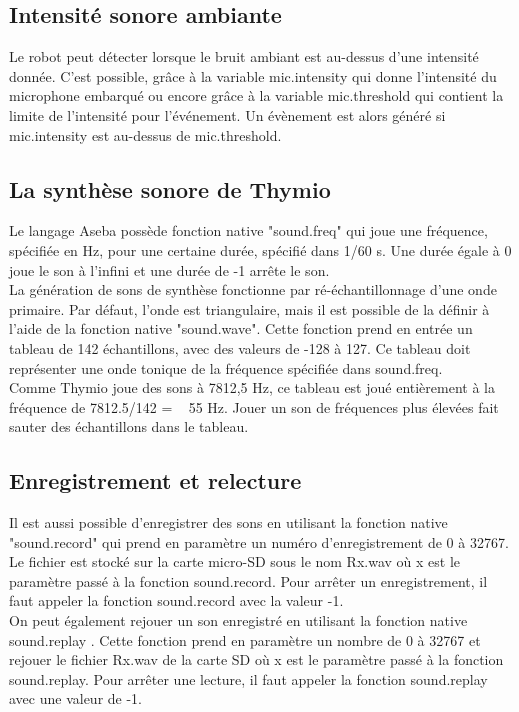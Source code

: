 \documentclass[a4paper, 12pt]{report}
\begin{document}
\subsection{Intensité sonore ambiante}
Le robot peut détecter lorsque le bruit ambiant est au-dessus d'une intensité donnée. C'est possible, grâce à la variable mic.intensity qui donne l'intensité du microphone embarqué ou encore grâce à la variable mic.threshold qui contient la limite de l'intensité pour l'événement. Un évènement est alors généré si mic.intensity est au-dessus de mic.threshold.\\

\subsection{La synthèse sonore de Thymio}
Le langage Aseba possède fonction native "sound.freq" qui joue une fréquence, spécifiée en Hz, pour une certaine durée, spécifié dans 1/60 s. Une durée égale à 0 joue le son à l'infini et une durée de -1 arrête le son.\\
La génération de sons de synthèse fonctionne par ré-échantillonnage d'une onde primaire. Par défaut, l'onde est triangulaire, mais il est possible de la	définir à l'aide de la fonction native "sound.wave". Cette fonction prend en entrée un tableau de 142 échantillons, avec des valeurs de -128 à 127. Ce tableau doit représenter une onde tonique de la fréquence spécifiée dans sound.freq.\\
 Comme Thymio joue des sons à 7812,5 Hz, ce tableau est joué entièrement à la fréquence de 7812.5/142 = ~ 55 Hz. Jouer un son de fréquences plus élevées fait sauter des échantillons dans le tableau.

\subsection{Enregistrement et relecture}
Il est aussi possible d'enregistrer des sons en utilisant la fonction native "sound.record" qui prend en paramètre un numéro d'enregistrement de 0 à 32767. Le fichier est stocké sur la carte micro-SD sous le nom Rx.wav où x est le paramètre passé à la fonction sound.record. Pour arrêter un enregistrement, il faut appeler la fonction sound.record avec la valeur -1.\\
On peut également rejouer un son enregistré en utilisant la fonction native sound.replay . Cette fonction prend en paramètre un nombre de 0 à 32767 et rejouer le fichier Rx.wav de la carte SD où x est le paramètre passé à la fonction sound.replay. Pour arrêter une lecture, il faut appeler la fonction sound.replay avec une valeur de -1.
\end{document}
